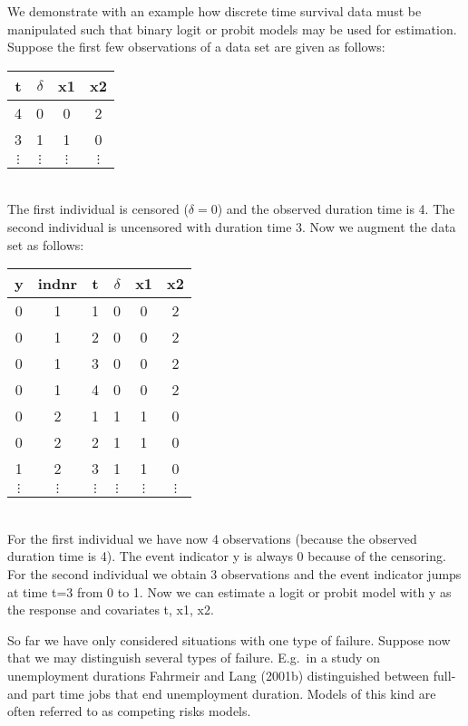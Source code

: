 We demonstrate with an example how discrete time survival data
must be manipulated such that  binary logit or probit models may
be used for estimation. Suppose the first few observations of a
data set are given as follows:
\vspace{0.5cm}\\
\begin{tabular}{c|c|c|c}
t & $\delta$ & x1 & x2\\\hline\hline
 4 & 0& 0 &2\\\hline
 3 & 1 &1 &0\\\hline
 $\vdots$ & $\vdots$ & $\vdots$ & $\vdots$\\
\end{tabular}
\vspace{0.5cm}\\
The first individual is censored ($\delta=0$) and the observed
duration time is 4. The second individual is uncensored with
duration time 3. Now we augment the data set as follows:
\vspace{0.5cm}\\
\begin{tabular}{c|c|c|c|c|c}
y & indnr & t &$\delta$ & x1 & x2\\\hline\hline
0 &  1 &   1 & 0  &    0  & 2\\
0 &  1 &   2 & 0  &    0  & 2\\
0 &  1 &   3&  0  &    0 &  2\\
0 &  1  &  4&  0  &    0 &  2\\\hline
0 &  2  &  1 & 1   &   1 &  0\\
0  & 2  &  2 & 1  &    1  & 0\\
1 &  2 &  3 & 1  &  1  & 0\\\hline
 $\vdots$ & $\vdots$ & $\vdots$ & $\vdots$& $\vdots$& $\vdots$\\
\end{tabular}
\vspace{0.5cm}\\
For the first individual we have now 4 observations (because the
observed duration time is 4). The event indicator y is always 0
because of the censoring. For the second individual we obtain 3
observations and the event indicator jumps at time t=3 from 0 to
1. Now we can estimate a logit or probit model with y as the
response and covariates t, x1, x2.

So far we have only considered situations with one type of
failure. Suppose now that we may distinguish several types of
failure. E.g.~in a study on unemployment durations Fahrmeir and
Lang (2001b) distinguished between full- and part time jobs that
end unemployment duration. Models of this kind are often referred
to as competing risks models.

